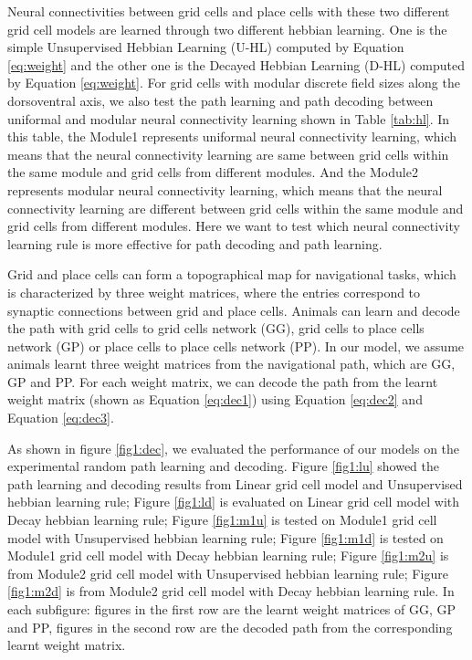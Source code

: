 \documentclass[11pt, letterpaper, onecolumn]{article}
\begin{document}
Neural connectivities between grid cells and place cells with these two different grid cell models are learned through two different hebbian learning. One is the simple Unsupervised Hebbian Learning (U-HL) computed by Equation \ref{eq:weight} and the other one is the Decayed Hebbian Learning (D-HL) computed by Equation \ref{eq:weight}. For grid cells with modular discrete field sizes along the dorsoventral axis, we also test the path learning and path decoding between uniformal and modular neural connectivity learning shown in Table \ref{tab:hl}.  In this table, the Module1 represents uniformal neural connectivity learning, which means that the neural connectivity learning are same between grid cells within the same module and grid cells from different modules. And the Module2 represents modular neural connectivity learning, which means that the neural connectivity learning are different between grid cells within the same module and grid cells from different modules.  Here we want to test which neural connectivity learning rule is more effective for path decoding and path learning.

Grid and place cells can form a topographical map for navigational tasks, which is characterized by three weight matrices, where the entries correspond to synaptic connections between grid and place cells. Animals can learn and decode the path with grid cells to grid cells network (GG), grid cells to place cells network (GP) or place cells to place cells network (PP). In our model, we assume animals learnt three weight matrices from the navigational path, which are GG, GP and PP. For each weight matrix, we can decode the path from the learnt weight matrix (shown as Equation \ref{eq:dec1}) using Equation \ref{eq:dec2} and Equation \ref{eq:dec3}.

As shown in figure \ref{fig1:dec}, we evaluated the performance of our models on the experimental random path learning and decoding. Figure \ref{fig1:lu} showed the path learning and decoding results from Linear grid cell model and Unsupervised hebbian learning rule; Figure \ref{fig1:ld} is evaluated on Linear grid cell model with Decay hebbian learning rule; Figure \ref{fig1:m1u} is tested on Module1 grid cell model with Unsupervised hebbian learning rule; Figure \ref{fig1:m1d} is tested on Module1 grid cell model with Decay hebbian learning rule; Figure \ref{fig1:m2u} is from Module2 grid cell model with Unsupervised hebbian learning rule; Figure \ref{fig1:m2d} is from Module2 grid cell model with Decay hebbian learning rule. In each subfigure: figures in the first row are the learnt weight matrices of GG, GP and PP, figures in the second row are the decoded path from the corresponding learnt weight matrix.
\end{document}
